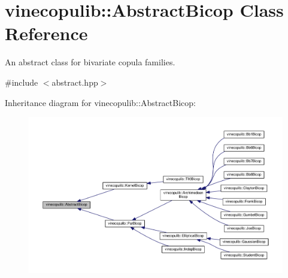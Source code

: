 \hypertarget{classvinecopulib_1_1_abstract_bicop}{\section{vinecopulib\+:\+:Abstract\+Bicop Class Reference}
\label{classvinecopulib_1_1_abstract_bicop}
}


An abstract class for bivariate copula families.  




{\ttfamily \#include $<$abstract.\+hpp$>$}



Inheritance diagram for vinecopulib\+:\+:Abstract\+Bicop\+:\nopagebreak
\begin{figure}[H]
\begin{center}
\leavevmode
\includegraphics[width=350pt]{classvinecopulib_1_1_abstract_bicop__inherit__graph}
\end{center}
\end{figure}

